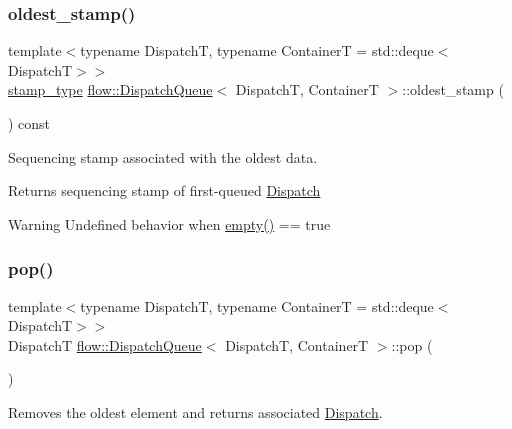 \subsubsection{\texorpdfstring{oldest\+\_\+stamp()}{oldest\_stamp()}}
{\footnotesize\ttfamily template$<$typename DispatchT, typename ContainerT = std\+::deque$<$\+Dispatch\+T$>$$>$ \\
\hyperlink{classflow_1_1_dispatch_queue_a7908f3d78b7f1767462244b94434d748}{stamp\+\_\+type} \hyperlink{classflow_1_1_dispatch_queue}{flow\+::\+Dispatch\+Queue}$<$ DispatchT, ContainerT $>$\+::oldest\+\_\+stamp (\begin{DoxyParamCaption}{ }\end{DoxyParamCaption}) const\hspace{0.3cm}{\ttfamily [inline]}}



Sequencing stamp associated with the oldest data. 

\begin{DoxyReturn}{Returns}
sequencing stamp of first-\/queued \hyperlink{classflow_1_1_dispatch}{Dispatch}
\end{DoxyReturn}
\begin{DoxyWarning}{Warning}
Undefined behavior when {\ttfamily \hyperlink{classflow_1_1_dispatch_queue_a447412abd83540a6c595dd7a17116c6c}{empty()} == true} 
\end{DoxyWarning}
\mbox{\label{classflow_1_1_dispatch_queue_a10607f6122683a4e24b44daaf8bf51fe}} 
\subsubsection{\texorpdfstring{pop()}{pop()}}
{\footnotesize\ttfamily template$<$typename DispatchT, typename ContainerT = std\+::deque$<$\+Dispatch\+T$>$$>$ \\
DispatchT \hyperlink{classflow_1_1_dispatch_queue}{flow\+::\+Dispatch\+Queue}$<$ DispatchT, ContainerT $>$\+::pop (\begin{DoxyParamCaption}{ }\end{DoxyParamCaption})\hspace{0.3cm}{\ttfamily [inline]}}



Removes the oldest element and returns associated \hyperlink{classflow_1_1_dispatch}{Dispatch}. 

